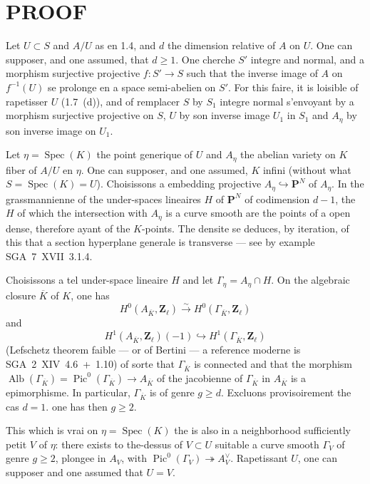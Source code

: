 \documentclass[12pt,a4paper]{article}
\theoremstyle{plain}
\theoremstyle{definition}
\theoremstyle{remark}
\DeclareMathOperator{\Pic}{Pic}
\DeclareMathOperator{\Spec}{Spec}
\DeclareMathOperator{\Alb}{Alb}
\begin{document}
\section{PROOF}

Let $U \subset S$ and $A/U$ as en 1.4, and $d$ the dimension relative of $A$ on $U$. One can supposer, and one assumed, that $d \geq 1$. One cherche $S'$ integre and normal, and a morphism surjective projective $f : S' \to S$ such that the inverse image of $A$ on $f^{-1}(U)$ se prolonge en a space semi-abelien on $S'$. For this faire, it is loisible of rapetisser $U$ (1.7~(d)), and of remplacer $S$ by $S_1$ integre normal s'envoyant by a morphism surjective projective on $S$, $U$ by son inverse image $U_1$ in $S_1$ and $A_\eta$ by son inverse image on $U_1$.

Let $\eta = \Spec(K)$ the point generique of $U$ and $A_\eta$ the abelian variety on $K$ fiber of $A/U$ en $\eta$. One can supposer, and one assumed, $K$ infini (without what $S = \Spec(K) = U$). Choisissons a embedding projective $A_\eta \hookrightarrow \mathbf{P}^N$ of $A_\eta$. In the grassmannienne of the under-spaces lineaires $H$ of $\mathbf{P}^N$ of codimension $d-1$, the $H$ of which the intersection with $A_\eta$ is a curve smooth are the points of a open dense, therefore ayant of the $K$-points. The densite se deduces, by iteration, of this that a section hyperplane generale is transverse --- see by example SGA~7~XVII~3.1.4.

Choisissons a tel under-space lineaire $H$ and let $\Gamma_\eta = A_\eta \cap H$. On the algebraic closure $\overline{K}$ of $K$, one has
\[
H^0(A_{\overline{K}}, \mathbf{Z}_\ell) \xrightarrow{\sim} H^0(\Gamma_{\overline{K}}, \mathbf{Z}_\ell)
\]
and
\[
H^1(A_{\overline{K}}, \mathbf{Z}_\ell)(-1) \hookrightarrow H^1(\Gamma_{\overline{K}}, \mathbf{Z}_\ell)
\]
(Lefschetz theorem faible --- or of Bertini --- a reference moderne is SGA~2~XIV~4.6~+~1.10) of sorte that $\Gamma_{\overline{K}}$ is connected and that the morphism $\Alb(\Gamma_{\overline{K}}) = \Pic^0(\Gamma_{\overline{K}}) \to A_{\overline{K}}$ of the jacobienne of $\Gamma_{\overline{K}}$ in $A_{\overline{K}}$ is a epimorphisme. In particular, $\Gamma_{\overline{K}}$ is of genre $g \geq d$. Excluons provisoirement the cas $d = 1$. one has then $g \geq 2$.

This which is vrai on $\eta = \Spec(K)$ the is also in a neighborhood sufficiently petit $V$ of $\eta$: there exists to the-dessus of $V \subset U$ suitable a curve smooth $\Gamma_V$ of genre $g \geq 2$, plongee in $A_V$, with $\Pic^0(\Gamma_V) \twoheadrightarrow A_V^\vee$. Rapetissant $U$, one can supposer and one assumed that $U = V$.
\end{document}

